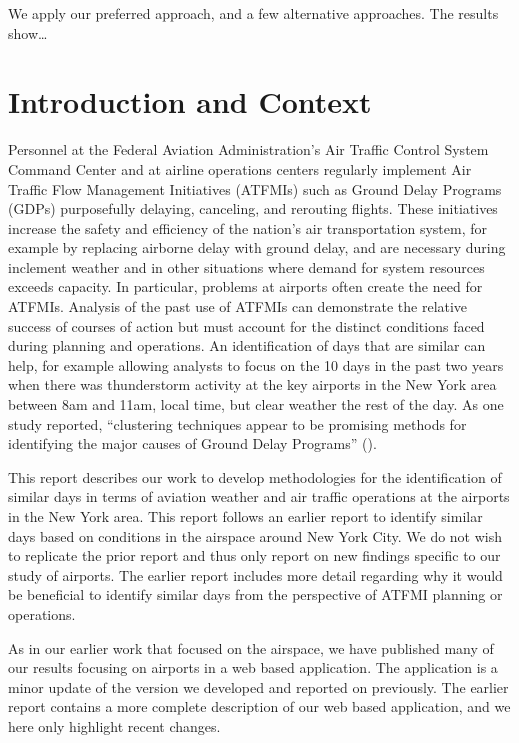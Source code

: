 \documentclass[11pt]{scrartcl}
\begin{document}
We apply our preferred approach, and a few alternative approaches.  The results show\dots

\newpage\noindent
\section{Introduction and Context}
Personnel at the Federal Aviation Administration's Air Traffic Control System Command Center and at airline operations centers regularly implement Air Traffic Flow Management Initiatives (ATFMIs) such as Ground Delay Programs (GDPs) purposefully delaying, canceling, and rerouting flights. These initiatives increase the safety and efficiency of the nation's air transportation system, for example by replacing airborne delay with ground delay, and are necessary during inclement weather and in other situations where demand for system resources exceeds capacity.  In particular, problems at airports often create the need for ATFMIs.  Analysis of the past use of ATFMIs can demonstrate the relative success of courses of action but must account for the distinct conditions faced during planning and operations.  An identification of days that are similar can help, for example allowing analysts to focus on the 10 days in the past two years when there was thunderstorm activity at the key airports in the New York area between 8am and 11am, local time, but clear weather the rest of the day.  As one study reported, ``clustering techniques appear to be promising methods for identifying the major causes of Ground Delay Programs'' (\cite{grabbe2013similar}).

This report describes our work to develop methodologies for the identification of similar days in terms of aviation weather and air traffic operations at the airports in the New York area.  This report follows an earlier report to identify similar days based on conditions in the airspace around New York City.  We do not wish to replicate the prior report and thus only report on new findings specific to our study of airports.  The earlier report includes more detail regarding why it would be beneficial to identify similar days from the perspective of ATFMI planning or operations.

As in our earlier work that focused on the airspace, we have published many of our results focusing on airports in a web based application.  The application is a minor update of the version we developed and reported on previously.  The earlier report contains a more complete description of our web based application, and we here only highlight recent changes.
\end{document}
